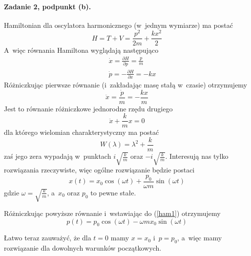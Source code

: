 \documentclass{article}
\newcommand*{\pd}[2]{\frac{\partial #1}{\partial #2}}
\begin{document}
\paragraph{Zadanie 2, podpunkt (b).}

Hamiltonian dla oscylatora harmonicznego (w~jednym wymiarze) ma postać
\[
H = T + V = \frac{p^2}{2m} + \frac{kx^2}{2}
\]
A~więc równania Hamiltona wyglądają następująco
\begin{eqnarray}
&& \dot{x} =  \pd{H}{p} = \frac{p}{m} \label{ham1} \\
&& \dot{p} = -\pd{H}{x} = -kx \label{ham2}
\end{eqnarray}
Różniczkując pierwsze równanie (i~zakładając masę stałą w~czasie) 
otrzymujemy
\[
\ddot{x} = \frac{\dot{p}}{m} = -\frac{kx}{m}
\]
Jest to równanie różniczkowe jednorodne rzędu drugiego
\[
\ddot{x} + \frac{k}{m}x = 0
\]
dla którego wielomian charakterystyczny ma postać
\[
W(\lambda) = \lambda^2 + \frac{k}{m}
\]
zaś jego zera wypadają w~punktach $i\sqrt{\frac{k}{m}}$ oraz 
$-i\sqrt{\frac{k}{m}}$. Interesują nas tylko rozwiązania rzeczywiste,
więc ogólne rozwiązanie będzie postaci
\[
x(t) = x_0 \cos\left(\omega t\right) + \frac{p_0}{\omega m} \sin\left(\omega t\right)
\]
gdzie $\omega = \sqrt{\frac{k}{m}}$, a~$x_0$ oraz ${p_0}$ to pewne stałe.

Różniczkując powyższe równanie i~wstawiając do (\ref{ham1}) otrzymujemy
\[
p(t) = p_0 \cos\left(\omega t\right) - \omega m x_0 \sin\left(\omega t\right)
\]

Łatwo teraz zauważyć, że dla $t=0$ mamy $x=x_0$ i~$p=p_0$, 
a~więc mamy rozwiązanie dla dowolnych warunków początkowych.
\end{document}
